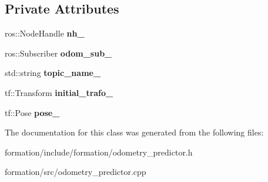 \subsection*{Private Attributes}
\begin{DoxyCompactItemize}
\item 
ros\+::\+Node\+Handle {\bfseries nh\+\_\+}\hypertarget{classOdometryPredictor_a7f30f2dc41e540c0e22544ae08d4a793}{}\label{classOdometryPredictor_a7f30f2dc41e540c0e22544ae08d4a793}

\item 
ros\+::\+Subscriber {\bfseries odom\+\_\+sub\+\_\+}\hypertarget{classOdometryPredictor_a90649d9a1d3bfa1ee6a5bd0fee0a329c}{}\label{classOdometryPredictor_a90649d9a1d3bfa1ee6a5bd0fee0a329c}

\item 
std\+::string {\bfseries topic\+\_\+name\+\_\+}\hypertarget{classOdometryPredictor_a222da0dc75ff986e0105520cbf1a85d0}{}\label{classOdometryPredictor_a222da0dc75ff986e0105520cbf1a85d0}

\item 
tf\+::\+Transform {\bfseries initial\+\_\+trafo\+\_\+}\hypertarget{classOdometryPredictor_ab2d3f0deca499511a9b446d864a7ff66}{}\label{classOdometryPredictor_ab2d3f0deca499511a9b446d864a7ff66}

\item 
tf\+::\+Pose {\bfseries pose\+\_\+}\hypertarget{classOdometryPredictor_aae2765bb63f00d48860a50ff9b692910}{}\label{classOdometryPredictor_aae2765bb63f00d48860a50ff9b692910}

\end{DoxyCompactItemize}


The documentation for this class was generated from the following files\+:\begin{DoxyCompactItemize}
\item 
formation/include/formation/odometry\+\_\+predictor.\+h\item 
formation/src/odometry\+\_\+predictor.\+cpp\end{DoxyCompactItemize}
